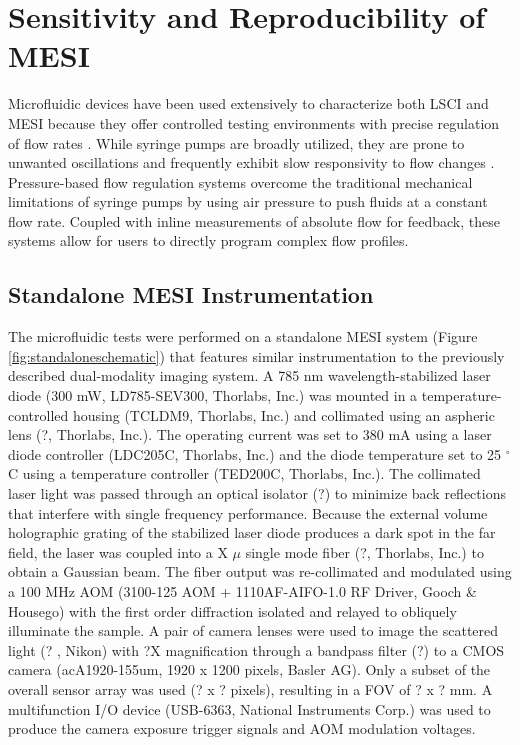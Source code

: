 \section{Sensitivity and Reproducibility of MESI}

Microfluidic devices have been used extensively to characterize both LSCI and MESI because they offer controlled testing environments with precise regulation of flow rates \cite{Parthasarathy:2008el, Richards:2013bi, Kazmi:2015du}. While syringe pumps are broadly utilized, they are prone to unwanted oscillations and frequently exhibit slow responsivity to flow changes \cite{Korczyk:2010eu, Zhou:2011ey, Li:2014ca}. Pressure-based flow regulation systems overcome the traditional mechanical limitations of syringe pumps by using air pressure to push fluids at a constant flow rate. Coupled with inline measurements of absolute flow for feedback, these systems allow for users to directly program complex flow profiles.

\subsection{Standalone MESI Instrumentation}

The microfluidic tests were performed on a standalone MESI system (Figure \ref{fig:standaloneschematic}) that features similar instrumentation to the previously described dual-modality imaging system. A 785 nm wavelength-stabilized laser diode (300 mW, LD785-SEV300, Thorlabs, Inc.) was mounted in a temperature-controlled housing (TCLDM9, Thorlabs, Inc.) and collimated using an aspheric lens (?, Thorlabs, Inc.). The operating current was set to 380 mA using a laser diode controller (LDC205C, Thorlabs, Inc.) and the diode temperature set to 25 $^\circ$C using a temperature controller (TED200C, Thorlabs, Inc.). The collimated laser light was passed through an optical isolator (?) to minimize back reflections that interfere with single frequency performance. Because the external volume holographic grating of the stabilized laser diode produces a dark spot in the far field, the laser was coupled into a X $\mu$ single mode fiber (?, Thorlabs, Inc.) to obtain a Gaussian beam. The fiber output was re-collimated and modulated using a 100 MHz AOM (3100-125 AOM + 1110AF-AIFO-1.0 RF Driver, Gooch \& Housego) with the first order diffraction isolated and relayed to obliquely illuminate the sample. A pair of camera lenses were used to image the scattered light (? , Nikon) with ?X magnification through a bandpass filter (?) to a CMOS camera (acA1920-155um, 1920 x 1200 pixels, Basler AG). Only a subset of the overall sensor array was used (? x ? pixels), resulting in a FOV of ? x ? mm. A multifunction I/O device (USB-6363, National Instruments Corp.) was used to produce the camera exposure trigger signals and AOM modulation voltages.

